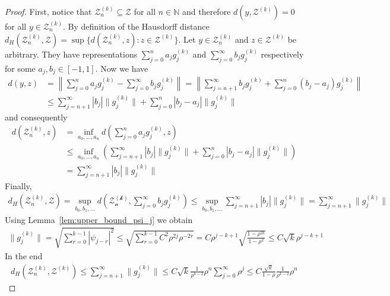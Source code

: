 \begin{proof}
    First, notice that $\mathcal{Z}_n^{(k)}\subseteq\mathcal{Z}$ for all $n\in\mathbb{N}$ and therefore $d(y,\mathcal{Z}^{(k)})=0$ for all $y\in\mathcal{Z}_n^{(k)}$. By definition of the Hausdorff distance $d_H(\mathcal{Z}_n^{(k)},\mathcal{Z})=\sup\{d(\mathcal{Z}_n^{(k)},z):z\in\mathcal{Z}^{(k)}\}$. Let $y\in\mathcal{Z}_n^{(k)}$ and $z\in\mathcal{Z}^{(k)}$ be arbitrary. They have representations $\sum_{j=0}^{n}a_jg_j^{(k)}$ and $\sum_{j=0}^{\infty}b_jg_j^{(k)}$ respectively for some $a_j,b_j\in[-1,1]$. Now we have
    \begin{align*}
        d(y,z)&=\left\|\sum_{j=0}^{n}a_jg_j^{(k)}-\sum_{j=0}^{\infty}b_jg_j^{(k)}\right\|=\left\|\sum_{j=n+1}^{\infty}b_jg_j^{(k)}+\sum_{j=0}^{n}(b_j-a_j)g_j^{(k)}\right\|\\
        &\le\sum_{j=n+1}^{\infty}|b_j|\|g_j^{(k)}\|+\sum_{j=0}^{n}|b_j-a_j|\|g_j^{(k)}\|
    \end{align*}
    and consequently
    \begin{align*}
        d(\mathcal{Z}_n^{(k)},z)&=\inf_{a_0,\dots,a_n}d\left(\sum_{j=0}^{n}a_jg_j^{(k)},z\right)\\&\le\inf_{a_0,\dots,a_n}\left(\sum_{j=n+1}^{\infty}|b_j|\|g_j^{(k)}\|+\sum_{j=0}^{n}|b_j-a_j|\|g_j^{(k)}\|\right)\\&
        =\sum_{j=n+1}^{\infty}|b_j|\|g_j^{(k)}\|
    \end{align*}
    Finally,
    \begin{align*}
        d_H(\mathcal{Z}_n^{(k)},\mathcal{Z})=\sup_{b_0,b_1,\dots}d\left(\mathcal{\mathcal{Z}_n^{(k)}},\sum_{j=0}^{\infty}b_jg_j^{(k)}\right)\le\sup_{b_0,b_1,\dots}\sum_{j=n+1}^{\infty}|b_j|\|g_j^{(k)}\|=\sum_{j=n+1}^{\infty}\|g_j^{(k)}\|
    \end{align*}
    Using Lemma~\ref{lem:upper_bound_psi_j} we obtain
    \begin{align*}
        \|g_j^{(k)}\|=\sqrt{\sum_{r=0}^{k-1}|\psi_{j-r}|^2}\le\sqrt{\sum_{r=0}^{k-1}C^2\rho^{2j}\rho^{-2r}}=C\rho^{j-k+1}\sqrt{\frac{1-\rho^{2k}}{1-\rho^2}}\le C\sqrt{k}\rho^{j-k+1}
    \end{align*}
    In the end
    \begin{align*}
        d_H(\mathcal{Z}_n^{(k)},\mathcal{Z}^{(k)})\le\sum_{j=n+1}^{\infty}\|g_j^{(k)}\|\le C\sqrt{k}\frac{1}{\rho^{k-2}}\rho^{n}\sum_{j=0}^{\infty}\rho^{j}\le C\frac{\sqrt{k}}{1-\rho}\frac{1}{\rho^{k-2}}\rho^{n}
    \end{align*}
\end{proof}


